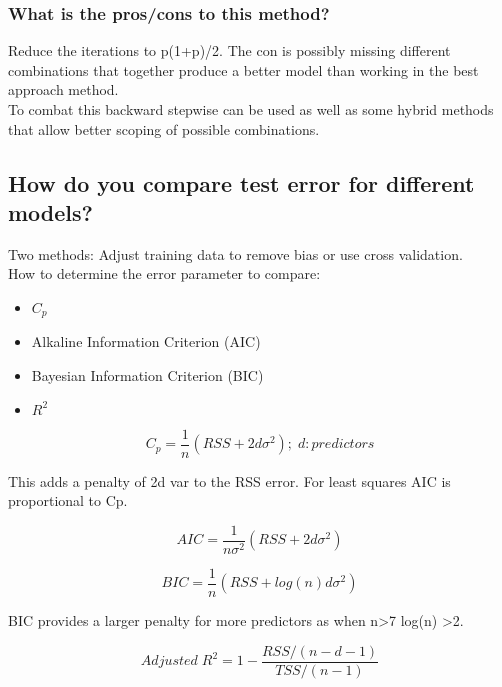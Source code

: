 \documentclass[11pt]{scrartcl} %
\begin{document}
\subsubsection{What is the pros/cons to this method?}

Reduce the iterations to p(1+p)/2. The con is possibly missing different combinations that together
produce a better model than working in the best approach method.\\

To combat this backward stepwise can be used as well as some hybrid methods that allow better scoping of
possible combinations.

\subsection{How do you compare test error for different models?}

Two methods: Adjust training data to remove bias or use cross validation.\\

How to determine the error parameter to compare:

\begin{itemize}
	\item \(C_p\)
	\item Alkaline Information Criterion (AIC)
	\item Bayesian Information Criterion (BIC)
	\item \(R^2\)
\end{itemize}

\begin{equation}
	C_p = \frac{1}{n}(RSS+2d\sigma^2);\; d:predictors
\end{equation}

This adds a penalty of 2d var to the RSS error. For least squares AIC is proportional to Cp.

\begin{equation}
	AIC = \frac{1}{n\sigma^2}(RSS+2d\sigma^2)
\end{equation}

\begin{equation}
	BIC = \frac{1}{n}(RSS + log(n)d\sigma^2)
\end{equation}

BIC provides a larger penalty for more predictors as when n>7 log(n) >2.

\begin{equation}
	Adjusted\; R^2 = 1 - \frac{RSS/(n-d-1)}{TSS/(n-1)}
\end{equation}
\end{document}
